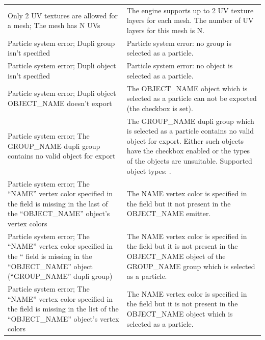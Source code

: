\documentclass[a4paper,12pt,oneside]{sphinxmanual}
\begin{document}
\begin{tabulary}{\linewidth}{|L|L|}
\hline

Only 2 UV textures are allowed for
a mesh; The mesh has N UVs
 & 
The engine supports up to 2 UV texture layers for each mesh. The number of UV layers for this mesh is N.
\\

Particle system error; Dupli group
isn't specified
 & 
Particle system error: no group is selected as a particle.
\\

Particle system error; Dupli object
isn't specified
 & 
Particle system error: no object is selected as a particle.
\\

Particle system error; Dupli object
OBJECT\_NAME doesn't export
 & 
The OBJECT\_NAME object which is selected as a particle can not be exported (the  checkbox is set).
\\

Particle system error; The
GROUP\_NAME dupli group contains no
valid object for export
 & 
The GROUP\_NAME dupli group which is selected as a particle contains no valid object for export. Either such objects have the  checkbox enabled or the types of the objects are unsuitable. Supported object types: .
\\

Particle system error; The ``NAME''
vertex color specified in the
 field is missing in the
last of the ``OBJECT\_NAME''
object's vertex colors
 & 
The NAME vertex color is specified in the  field but it not present in the OBJECT\_NAME emitter.
\\

Particle system error; The
``NAME'' vertex color specified in
the `` field is missing in the
``OBJECT\_NAME'' object
(``GROUP\_NAME'' dupli group)
 & 
The NAME vertex color is specified in the  field but it is not present in the OBJECT\_NAME object of the GROUP\_NAME group which is selected as a particle.
\\

Particle system error; The ``NAME''
vertex color specified in the
 field is missing in the list
of the ``OBJECT\_NAME''
object's vertex colors
 & 
The NAME vertex color is specified in the  field but it is not present in the OBJECT\_NAME object which is selected as a particle.
\\


\end{tabulary}
\end{document}
